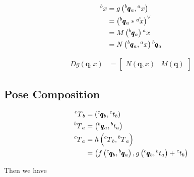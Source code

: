\documentclass{article}
\begin{document}
\begin{align*}
	\prescript{b}{}{x} & = g\left(\prescript{b}{}{\pmb{q}}_a, \prescript{a}{}{x}\right)                              \\
	                   & = \left(\prescript{b}{}{\pmb{q}}_a * \hat{\prescript{a}{}{x}}\right)^\vee                   \\
	                   & = M\left( \prescript{b}{}{\pmb{q}}_a \right) \prescript{a}{}{x}                             \\
	                   & = N\left( \prescript{b}{}{\pmb{q}}_a, \prescript{a}{}{x} \right) \prescript{b}{}{\pmb{q}}_a
\end{align*}

\begin{align*}
	Dg(\pmb{q}, x) & = \begin{bmatrix}
		                   N(\pmb{q}, x) & M(\pmb{q})
	                   \end{bmatrix}
\end{align*}

\subsection{Pose Composition}

\begin{align*}
	\prescript{c}{}{T}_b & = \left( \prescript{c}{}{\pmb{q}}_b, \prescript{c}{}{t}_b \right)                                                                                                                \\
	\prescript{b}{}{T}_a & = \left( \prescript{b}{}{\pmb{q}}_a, \prescript{b}{}{t}_a \right)                                                                                                                \\
	\prescript{c}{}{T}_a & = h\left( \prescript{c}{}{T}_b, \prescript{b}{}{T}_a \right)                                                                                                                     \\
	                     & = \left( f\left(\prescript{c}{}{\pmb{q}}_b, \prescript{b}{}{\pmb{q}}_a \right), g \left( \prescript{c}{}{\pmb{q}}_b, \prescript{b}{}{t}_a \right) + \prescript{c}{}{t}_b \right) \\
\end{align*}

Then we have
\end{document}
